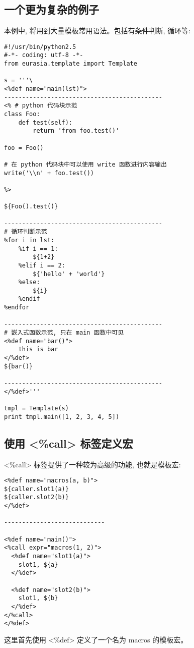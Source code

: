 \documentclass{manual}
\begin{document}
\subsection{一个更为复杂的例子}

本例中, 将用到大量模板常用语法。包括有条件判断, 循环等:

\begin{verbatim}
#!/usr/bin/python2.5
#-*- coding: utf-8 -*-
from eurasia.template import Template

s = '''\
<%def name="main(lst)">
--------------------------------------------
<% # python 代码块示范
class Foo:
	def test(self):
		return 'from foo.test()'

foo = Foo()

# 在 python 代码块中可以使用 write 函数进行内容输出
write('\\n' + foo.test())

%>

${Foo().test()}

--------------------------------------------
# 循环判断示范
%for i in lst:
	%if i == 1:
		${1+2}
	%elif i == 2:
		${'hello' + 'world'}
	%else:
		${i}
	%endif
%endfor

--------------------------------------------
# 嵌入式函数示范, 只在 main 函数中可见
<%def name="bar()">
	this is bar
</%def>
${bar()}

--------------------------------------------
</%def>'''

tmpl = Template(s)
print tmpl.main([1, 2, 3, 4, 5])
\end{verbatim}

\subsection{使用 <\%call> 标签定义宏}

<\%call> 标签提供了一种较为高级的功能, 也就是模板宏:

\begin{verbatim}
<%def name="macros(a, b)">
${caller.slot1(a)}
${caller.slot2(b)}
</%def>

----------------------------

<%def name="main()">
<%call expr="macros(1, 2)">
  <%def name="slot1(a)">
    slot1, ${a}
  </%def>

  <%def name="slot2(b)">
    slot1, ${b}
  </%def>
</%call>
</%def>
\end{verbatim}

这里首先使用 <\%def> 定义了一个名为 macros 的模板宏。
\end{document}

